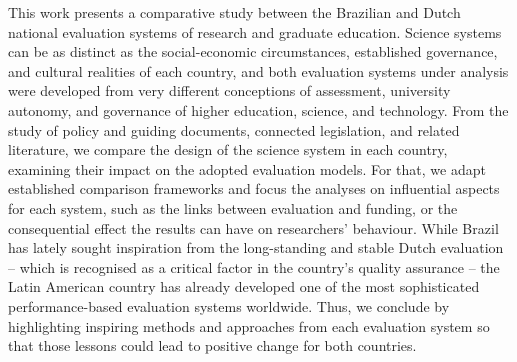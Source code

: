 This work presents a comparative study between the Brazilian and Dutch national evaluation systems of research and graduate education. Science systems can be as distinct as the social-economic circumstances, established governance, and cultural realities of each country, and both evaluation systems under analysis were developed from very different conceptions of assessment, university autonomy, and governance of higher education, science, and technology. From the study of policy and guiding documents, connected legislation, and related literature, we compare the design of the science system in each country, examining their impact on the adopted evaluation models. For that, we adapt established comparison frameworks and focus the analyses on influential aspects for each system, such as the links between evaluation and funding, or the consequential effect the results can have on researchers' behaviour. While Brazil has lately sought inspiration from the long-standing and stable Dutch evaluation -- which is recognised as a critical factor in the country's quality assurance -- the Latin American country has already developed one of the most sophisticated performance-based evaluation systems worldwide. Thus, we conclude by highlighting inspiring methods and approaches from each evaluation system so that those lessons could lead to positive change for both countries. 